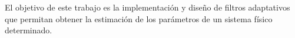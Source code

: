 	El objetivo de este trabajo es la implementación y diseño de filtros adaptativos que permitan obtener la estimación de los parámetros de un sistema físico determinado.
